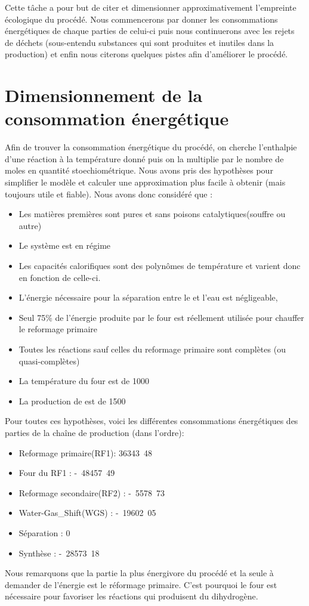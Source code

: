 
Cette tâche a pour but de citer et dimensionner approximativement l'empreinte écologique du procédé. Nous commencerons par donner les consommations énergétiques de chaque parties de celui-ci puis nous continuerons avec les rejets de déchets (sous-entendu substances qui sont produites et inutiles dans la production) et enfin nous citerons quelques pistes afin d'améliorer le procédé.

\section{Dimensionnement de la consommation énergétique}
\label{dim}
Afin de trouver la consommation énergétique du procédé, on cherche l'enthalpie d'une réaction à la température donné puis on la multiplie par le nombre de moles en quantité stoechiométrique. Nous avons pris des hypothèses pour simplifier le modèle et calculer une approximation plus facile à obtenir (mais toujours utile et fiable). Nous avons donc considéré que :
\begin{itemize}
	\item Les matières premières sont pures et sans poisons catalytiques(souffre ou autre)
	\item Le système est en régime
  \item Les capacités calorifiques sont des polynômes de température et varient donc en fonction de celle-ci.
	\item L'énergie nécessaire pour la séparation entre le  et l'eau est négligeable,
	\item Seul 75\% de l'énergie produite par le four est réellement utilisée pour chauffer le reformage primaire
	\item Toutes les réactions sauf celles du reformage primaire sont complètes (ou quasi-complètes)
	\item La température du four est de \unit{1000}{\kelvin}
	\item La production de  est de \unit{1500}{\ton\per\dday}
\end{itemize}
	
Pour toutes ces hypothèses, voici les différentes consommations énergétiques des parties de la chaîne de production (dans l'ordre):
\begin{itemize}
	\item Reformage primaire(RF1): \unit{36343.48}{\kilo\joules}
	\item Four du RF1 : \unit{-48457.49}{\kilo\joules}
	\item Reformage secondaire(RF2) : \unit{-5578.73}{\kilo\joules}
	\item Water-Gas_Shift(WGS) : \unit{-19602.05}{\kilo\joules}
	\item Séparation : \unit{0}{\kilo\joules}
	\item Synthèse : \unit{-28573.18}{\kilo\joules}
\end{itemize}
Nous remarquons que la partie la plus énergivore du procédé et la seule à demander de l'énergie est le réformage primaire. C'est pourquoi le four est nécessaire pour favoriser les réactions qui produisent du dihydrogène.

